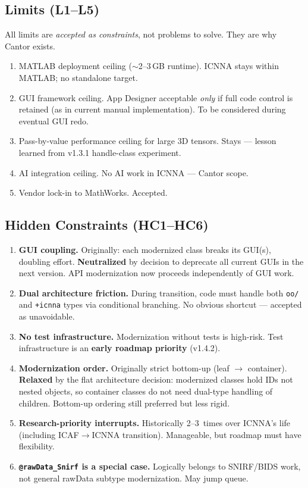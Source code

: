 \documentclass[11pt,a4paper]{article}
\begin{document}
\subsection{Limits (L1--L5)}

All limits are \emph{accepted as constraints}, not problems to solve. They are why Cantor exists.

\begin{enumerate}[label=\textbf{L\arabic*.}]
    \item MATLAB deployment ceiling ($\sim$2--3\,GB runtime). ICNNA stays within MATLAB; no standalone target.
    \item GUI framework ceiling. App Designer acceptable \emph{only} if full code control is retained (as in current manual implementation). To be considered during eventual GUI redo.
    \item Pass-by-value performance ceiling for large 3D tensors. Stays --- lesson learned from v1.3.1 handle-class experiment.
    \item AI integration ceiling. No AI work in ICNNA --- Cantor scope.
    \item Vendor lock-in to MathWorks. Accepted.
\end{enumerate}

\subsection{Hidden Constraints (HC1--HC6)}

\begin{enumerate}[label=\textbf{HC\arabic*.}]
    \item \textbf{GUI coupling.} Originally: each modernized class breaks its GUI(s), doubling effort. \textbf{Neutralized} by decision to deprecate all current GUIs in the next version. API modernization now proceeds independently of GUI work.
    \item \textbf{Dual architecture friction.} During transition, code must handle both \texttt{oo/} and \texttt{+icnna} types via conditional branching. No obvious shortcut --- accepted as unavoidable.
    \item \textbf{No test infrastructure.} Modernization without tests is high-risk. Test infrastructure is an \textbf{early roadmap priority} (v1.4.2).
    \item \textbf{Modernization order.} Originally strict bottom-up (leaf $\to$ container). \textbf{Relaxed} by the flat architecture decision: modernized classes hold IDs not nested objects, so container classes do not need dual-type handling of children. Bottom-up ordering still preferred but less rigid.
    \item \textbf{Research-priority interrupts.} Historically 2--3~times over ICNNA's life (including ICAF$\to$ICNNA transition). Manageable, but roadmap must have flexibility.
    \item \textbf{\texttt{@rawData\_Snirf} is a special case.} Logically belongs to SNIRF/BIDS work, not general rawData subtype modernization. May jump queue.
\end{enumerate}
\end{document}
